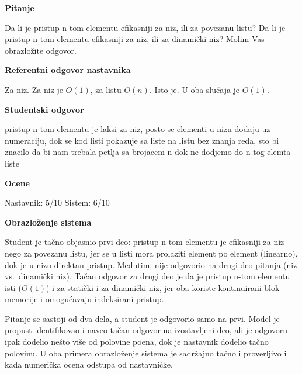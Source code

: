 \begin{tcolorbox}[promptbox]

\textbf{Pitanje}

Da li je pristup n-tom elementu efikasniji za niz, ili za povezanu listu?
Da li je pristup n-tom elementu efikasniji za niz, ili za dinamički niz?
Molim Vas obrazložite odgovor.

\medskip
\textbf{Referentni odgovor nastavnika}
\nopagebreak

Za niz. Za niz je $O(1)$, za listu $O(n)$.
Isto je. U oba slučaja je $O(1)$.

\medskip
\begin{samepage}
\textbf{Studentski odgovor}
\nopagebreak

pristup n-tom elementu je laksi za niz, posto se elementi u nizu dodaju uz numeraciju,
dok se kod listi pokazuje sa liste na listu bez znanja reda, sto bi znacilo da bi nam trebala petlja sa brojacem n dok ne dodjemo do n tog elemta liste

\end{samepage}

\medskip
\textbf{Ocene}
\nopagebreak

Nastavnik: 5/10 \hfill Sistem: 6/10

\medskip
\textbf{Obrazloženje sistema}
\nopagebreak

Student je tačno objasnio prvi deo: pristup n-tom elementu je efikasniji za niz nego za povezanu listu,
jer se u listi mora prolaziti element po element (linearno), dok je u nizu direktan pristup.
Međutim, nije odgovorio na drugi deo pitanja (niz vs.\ dinamički niz).
Tačan odgovor za drugi deo je da je pristup n-tom elementu isti ($O(1)$) i za statički i za dinamički niz,
jer oba koriste kontinuirani blok memorije i omogućavaju indeksirani pristup.

\end{tcolorbox}

Pitanje se sastoji od dva dela, a student je odgovorio samo na prvi.
Model je propust identifikovao i naveo tačan odgovor na izostavljeni deo,
ali je odgovoru ipak dodelio nešto više od polovine poena, dok je nastavnik dodelio tačno polovinu.
U oba primera obrazloženje sistema je sadržajno tačno i proverljivo i kada numerička ocena odstupa od nastavničke.
